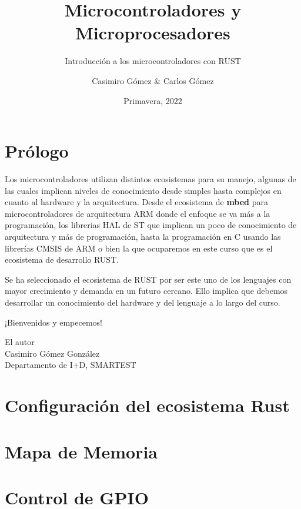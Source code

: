 \documentclass[11pt,fancy]{elegantbook}
\title{Microcontroladores y Microprocesadores}
\subtitle{Introducción a los microcontroladores con RUST}
\author{Casimiro Gómez \& Carlos Gómez}
\institute{Naktan}
\date{Primavera, 2022}
\begin{document}
\maketitle

\frontmatter
\tableofcontents

\mainmatter

\chapter*{Prólogo}

Los microcontroladores utilizan distintos ecosistemas para su manejo, algunas de las cuales implican niveles de conocimiento desde simples hasta complejos en cuanto al hardware y la arquitectura. Desde el ecosistema de \textbf{mbed} para microcontroladores de arquitectura ARM  donde el enfoque se va más a la programación, los librerias HAL de ST que implican un poco de conocimiento de arquitectura y más de programación, hasta la programación en C usando las librerías CMSIS de ARM o bien la que ocuparemos en este curso que es el ecosistema de desarrollo RUST.

Se ha seleccionado el ecosistema de RUST por ser este uno de los lenguajes con mayor crecimiento y demanda en un futuro cercano. Ello implica que debemos desarrollar un conocimiento del hardware y del lenguaje a lo largo del curso.

¡Bienvenidos y empecemos!

\begin{flushright}

El autor\\
Casimiro Gómez González\\
Departamento de I+D, SMARTEST
\end{flushright}

\chapter{Configuración del ecosistema Rust}



\chapter{Mapa de Memoria}


\chapter{Control de GPIO}

\end{document}

